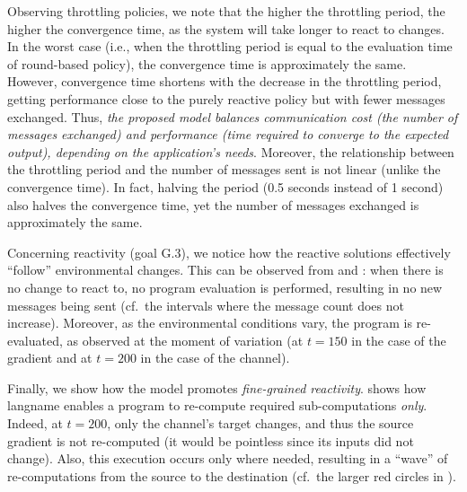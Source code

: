 Observing throttling policies, 
 we note that the higher the throttling period, 
 the higher the convergence time, 
 as the system will take longer to react to changes.
%
In the worst case 
 (i.e., when the throttling period is equal to the evaluation time of round-based policy), 
 the convergence time is approximately the same.
%
However,
convergence time shortens with the decrease in the throttling period,
getting performance close to the purely reactive policy
but with fewer messages exchanged.
%
Thus, 
\emph{the proposed model balances communication cost
    (the number of messages exchanged)
    and performance
    (time required to converge to the expected output),
    depending on the application's needs}.
%
Moreover,
the relationship between the throttling period and
the number of messages sent is not linear
(unlike the convergence time).
%
In fact,
halving the period (0.5 seconds instead of 1 second)
also halves the convergence time,
yet
the number of messages exchanged is approximately the same.

Concerning reactivity (goal G.3), 
 we notice how the reactive solutions effectively ``follow'' environmental changes.
%
This can be observed from 
   and :
  when there is no change to react to, 
 no program evaluation is performed, 
 resulting in no new messages being sent
 (cf.\ the intervals where the message count does not increase).
%
Moreover, as the environmental conditions vary, 
 the program is re-evaluated, as observed at the moment of variation
(at $t=150$ in the case of the gradient and at $t=200$ in the case of the channel).
 
Finally, we show how the model promotes \emph{fine-grained reactivity}.
%
 shows how
 \ac{langname} enables a program to re-compute required sub-computations \emph{only}.
%
Indeed, at $t=200$, only the channel's target changes,
and thus the source gradient is not re-computed
(it would be pointless since its inputs did not change).
%
Also, this execution occurs only where needed, 
 resulting in a ``wave'' of re-computations from the source to the destination
(cf.\ the larger red circles in ).

